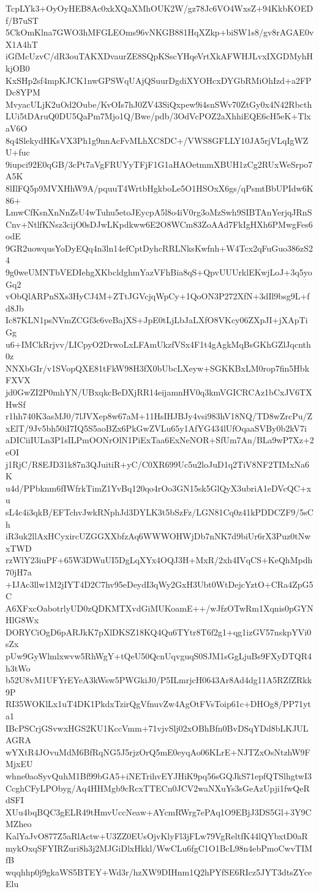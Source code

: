 TcpLYk3+OyOyHEB8Ac0xkXQaXMhOUK2W/gz78Jc6VO4WxsZ+94KkbKOEDf/B7uST
5CkOmKlna7GWO3hMFGLEOms96vNKGB881HqXZkp+biSW1s8/gv8rAGAE0vX1A4hT
iGfMcUzvC/dR3ouTAKXDvaurZE8SQpKSscYHqeVrtXkAFWHJLvxIXGDMyhHkjOB0
KxSHp2sf4mpKJCK1nwGPSWqUAjQSuurDgdiXYOHcxDYGbRMiOhIzd+a2FPDc8YPM
MvyacULjK2uOd2Oube/KvOIs7hJ0ZV43SiQxpew9i4snSWv70ZtGy0x4N42Rbcth
LUi5tDAruQ0DU5QaPm7Mjo1Q/Bwe/pdb/3OdVcPOZ2aXhhiEQE6cH5eK+TlxaV6O
8q4SlekydHKsVX3Ph1g9nnAcFvMLhXC8DC+/VWS8GFLLY10JA5rjVLqIgWZU+fuc
9iupci92E0qGB/3cPt7aVgFRUYyTFjF1G1aHAOetmmXBUH1zCg2RUxWeSrpo7A5K
8lIlFQ5p9MVXHhW9A/pquuT4WrtbHgkboLe5O1HSOxX6gs/qPsmtBbUPIdw6K86+
LmwCfKsnXnNnZsU4wTuhu5etoJEycpA5l8o4iV0rg3oMzSwh9SIBTAnYerjqJRnS
Cnv+NtlfKNsz3cijO0sDJwLKpdkww6E2O8WCm83ZoAAd7FkIgHXh6PMwgFes6odE
9GR2uowqusYoDyEQq4n3ln14efCptDyhcRRLNksKwfnh+W4Tcx2qFuGuo386zS24
9g0weUMNTbVEDIehgXKbcldghmYazVFhBia8qS+QpvUUUrklEKwjLoJ+3q5yoGq2
vObQlARPnSXs3HyCJ4M+ZTtJGVcjqWpCy+1QoON3P272XfN+3dIl9bsg9L+fd8Jb
Ic87KLN1psNVmZCGf3c6veBajXS+JpE0tLjLbJaLXfO8VKcy06ZXpJI+jXApTiGg
u6+IMCkRrjvv/LICpyO2DrwoLxLFAmUkzfVSx4F1t4gAgkMqBsGKhGZlJqcnth0z
NNXbGIr/v1SVopQXE81tFkW98H3fX0bUbcLXeyw+SGKKBxLM0rop7fin5HbkFXVX
jd0GwZI2P0mhYN/UBxqkcBeDXjRR14eijamnHV0q3kmVGICRCAz1bCxJV6TXHwSf
r1hh740K3asMJ0/7lJVXep8w67aM+11HsIHJBJy4vsi983hV18NQ/TD8wZrcPu/Z
xElT/9Jv5bh50iI7IQ5S5aoBZx6PkGwZVLu65y1AfYG434lUfOqaaSVBy0b2kV7i
aDICiiIULn3P1sILPmOONrOlN1PiExTaa6ExNeNOR+SfUm7An/BLa9wP7Xz+2eOI
j1RjC/R8EJD31k87n3QJuitiR+yC/C0XR699Uc5u2loJuD1q2TiV8NF2TIMxNa6K
u4d/PPbknm6fIWfrkTimZ1YvBq120qo4rOo3GN15sk5GlQyX3ubriA1eDVcQC+xu
sL4c4i3qkB/EFTchvJwkRNphJd3DYLK3t5bSzFz/LGN81Cq0z41kPDDCZF9/5sCh
iR3uk2llAxHCyxircUZGGXXbfzAq6WWWOHWjDb7nNK7d9biUr6rX3Puz0tNwxTWD
rzWlY23iuPF+65W3DWuUI5DgLqXYx4OQJ3H+MxR/2xh4IVqCS+KeQhMpdh70jH7a
+IJAc3llw1M2jIYT4D2C7hv95eDeydI3qWy2GxH3Ubt0WtDejcYztO+CRa4ZpG5C
A6XFxcOabotrlyUD0zQDKMTXvdGiMUKoamE++/wJfzOTwRm1Xqnis0pGYNHlG8Wx
DORYCiOgD6pARJkK7pXlDKSZ18KQ4Qu6TYtr8T6f2g1+qg1izGV57nskpYVi0sZx
pUw9GyWlmlxwvw5RhWgY+tQeU50QcnUqvguqS0SJM1sGgLjuBs9FXyDTQR4h3tWo
b52U8vM1UFYrEYeA3kWsw5PWGkiJ0/P5ILmrjcH0643Ar8Ad4dg11A5RZfZRkk9P
RI35WOKlLx1uT4DK1PkdxTzirQgVfnuvZw4AgOtFVsToip61c+DHOg8/PP71yta1
IBcPSCrjGSvwxHGS2KU1KccVmm+71vjvSlj02xOBhBfn0BvDSqYDd8bLKJULAGRA
wYXtR4JOvuMdM6BfRqNG5J5rjzOrQ5mE0eyqAo06KLrE+NJTZxOsNtzhW9FMjxEU
whne0aoSyvQuhM1Bf99bGA5+iNETrihvEYJHiK9pq56sGQJkS71epfQTSlhgtwI3
CcghCFyLPObyg/Aq4HHMgb9cRcxTTECn0JCV2waNXuYs3sGeAzUpji1fwQeRdSFI
XUu4bqBQC3gELR49tHmvUccNeaw+AYcmRWrg7ePAq1O9EBjJ3DS5Gl+3Y9CMZheo
KalYaJvO877Z5aRlActw+U3ZZ0EUsOjvKlyFl3jFLw79VgReltfK44lQYbxtD0aR
mykOxqSFYIRZuri8h3j2MJGiDlxHkkl/WwCLu6fgC1O1BcL98n4ebPmoCwvTIMfB
wqqhhp0j9gkaWS5BTEY+Wd3r/hzXW9DIHnm1Q2hPYfSE6RIcz5JYT3dtsZYceElu
